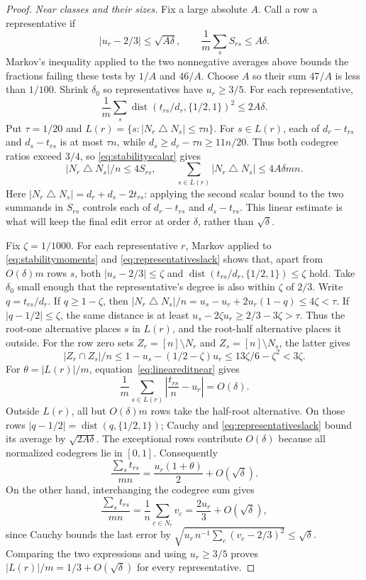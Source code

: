 \documentclass[10pt,a4paper]{amsart}
\begin{document}
\begin{proof}
\smallskip\noindent\emph{Near classes and their sizes.}
Fix a large absolute $A$. Call a row a representative if
\[
 |u_r-2/3|\le\sqrt{A\delta},\qquad
 \frac1m\sum_sS_{rs}\le A\delta.
\]
Markov's inequality applied to the two nonnegative averages above bounds
the fractions failing these tests by $1/A$ and $46/A$.
Choose $A$ so their sum $47/A$ is less than $1/100$.
Shrink $\delta_0$ so representatives have $u_r\ge3/5$.
For each representative,
\begin{equation}\label{eq:representativeslack}
 \frac1m\sum_s\operatorname{dist}(t_{rs}/d_r,\{1/2,1\})^2
 \le2A\delta.
\end{equation}
Put $\tau=1/20$ and
$L(r)=\{s:|N_r\mathbin\triangle N_s|\le\tau n\}$.
For $s\in L(r)$, each of $d_r-t_{rs}$ and $d_s-t_{rs}$ is at most
$\tau n$, while $d_s\ge d_r-\tau n\ge11n/20$.
Thus both codegree ratios exceed $3/4$, so
\eqref{eq:stabilityscalar} gives
\begin{equation}\label{eq:lineareditnear}
 |N_r\mathbin\triangle N_s|/n\le4S_{rs},\qquad
 \sum_{s\in L(r)}|N_r\mathbin\triangle N_s|\le4A\delta mn.
\end{equation}
Here $|N_r\mathbin\triangle N_s|=d_r+d_s-2t_{rs}$: applying
the second scalar bound to the two summands in $S_{rs}$ controls each
of $d_r-t_{rs}$ and $d_s-t_{rs}$. This linear estimate is what will
keep the final edit error at order $\delta$, rather than $\sqrt\delta$.

Fix $\zeta=1/1000$. For each representative $r$, Markov applied to
\eqref{eq:stabilitymoments} and \eqref{eq:representativeslack} shows
that, apart from $O(\delta)m$ rows $s$, both
$|u_s-2/3|\le\zeta$ and
$\operatorname{dist}(t_{rs}/d_r,\{1/2,1\})\le\zeta$ hold.
Take $\delta_0$ small enough that the representative's degree is also
within $\zeta$ of $2/3$. Write $q=t_{rs}/d_r$. If $q\ge1-\zeta$, then
$|N_r\mathbin\triangle N_s|/n=u_s-u_r+2u_r(1-q)\le4\zeta<\tau$.
If $|q-1/2|\le\zeta$, the same distance is at least
$u_s-2\zeta u_r\ge2/3-3\zeta>\tau$.
Thus the root-one alternative places $s$ in $L(r)$, and the
root-half alternative places it outside. For the row zero sets
$Z_r=[n]\setminus N_r$ and $Z_s=[n]\setminus N_s$, the latter gives
\[
 |Z_r\cap Z_s|/n\le1-u_s-(1/2-\zeta)u_r
       \le13\zeta/6-\zeta^2<3\zeta.
\]
For $\theta=|L(r)|/m$, equation~\eqref{eq:lineareditnear} gives
\[
 \frac1m\sum_{s\in L(r)}\left|\frac{t_{rs}}n-u_r\right|=O(\delta).
\]
Outside $L(r)$, all but $O(\delta)m$ rows take the half-root alternative.
On those rows $|q-1/2|=\operatorname{dist}(q,\{1/2,1\})$; Cauchy and
\eqref{eq:representativeslack} bound its average by $\sqrt{2A\delta}$.
The exceptional rows contribute $O(\delta)$ because all normalized
codegrees lie in $[0,1]$. Consequently
\[
 \frac{\sum_s t_{rs}}{mn}
 =\frac{u_r(1+\theta)}2+O(\sqrt\delta).
\]
On the other hand, interchanging the codegree sum gives
\[
 \frac{\sum_s t_{rs}}{mn}
 =\frac1n\sum_{c\in N_r}v_c
 =\frac{2u_r}{3}+O(\sqrt\delta),
\]
since Cauchy bounds the last error by
$\sqrt{u_r\,n^{-1}\sum_c(v_c-2/3)^2}\le\sqrt\delta$.
Comparing the two expressions and using $u_r\ge3/5$ proves
$|L(r)|/m=1/3+O(\sqrt\delta)$ for every representative.


\end{proof}
\end{document}
